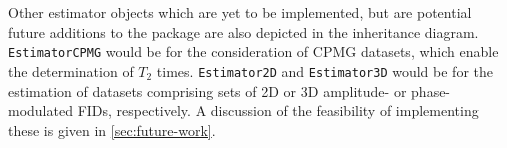 Other estimator objects which are yet to be implemented, but are potential
future additions to the package are also depicted in the inheritance diagram.
\texttt{EstimatorCPMG} would be for the consideration of \ac{CPMG} datasets,
which enable the determination of $T_2$ times.
\texttt{Estimator2D} and \texttt{Estimator3D} would be
for the estimation of datasets comprising sets of \ac{2D} or \ac{3D} amplitude-
or phase-modulated \acp{FID}, respectively. A discussion of the feasibility of
implementing these is given in \cref{sec:future-work}.

